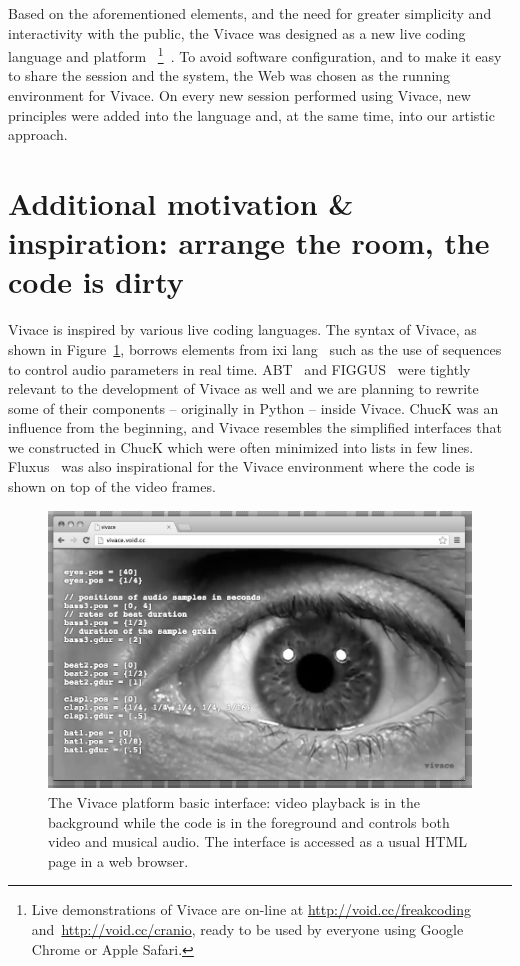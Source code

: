 \documentclass[12pt,times,twocolumn]{article}
\begin{document}
Based on the aforementioned elements, and the need for greater simplicity
and interactivity with the public, the Vivace was designed as a new live coding language and platform
~\footnote{Live demonstrations of Vivace are on-line at
    \url{http://void.cc/freakcoding} and~\url{http://void.cc/cranio},
    ready to be used by everyone using
  Google Chrome or Apple Safari.}~\cite{Vivace}. To avoid software
configuration, and to make it easy to share the session and the
system, the Web was chosen as the running
environment for Vivace. On every new session performed using Vivace,
new principles were added into the language and, at the same time,
into our artistic approach.

\section{Additional motivation \& inspiration: arrange the room, the code is dirty}
Vivace is inspired by various live coding languages. The syntax of
Vivace, as shown in Figure~\ref{fig:vivace}, borrows elements from ixi
lang~\cite{magnusson2011ixi} such as the use of sequences to control
audio parameters in real time. ABT~\cite{fabbri} and
FIGGUS~\cite{fabbri2} were tightly relevant to the development of
Vivace as well and we are planning to rewrite some of their components
-- originally in Python -- inside Vivace.
ChucK was an influence from the beginning, and Vivace resembles the simplified
interfaces that we constructed in ChucK which were often minimized into lists in few lines.
Fluxus~\cite{fluxus} was also inspirational for the Vivace
environment where the code is shown on top of the video frames.

\begin{figure}[htpb]
  \begin{center}
    \includegraphics[scale=.35]{img/fig_vivace_.png}
    \caption{The Vivace platform basic interface: video playback is in the background while the code is in the foreground and controls both video and musical audio. The interface is accessed as a usual HTML page in a web browser.}
    \label{fig:vivace}
  \end{center}
\end{figure}
\end{document}

